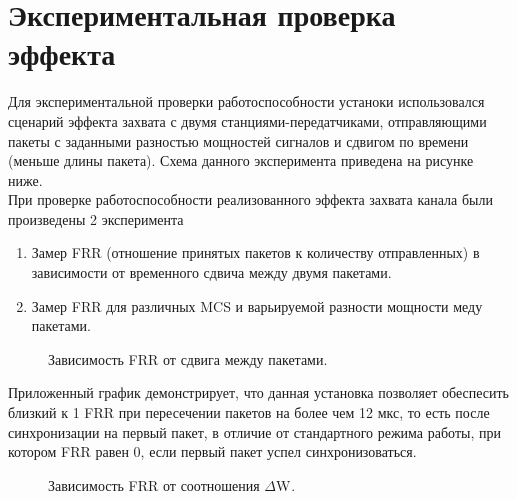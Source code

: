 \documentclass{llncs}
\begin{document}
\section{Экспериментальная проверка эффекта}
Для экспериментальной проверки работоспособности устаноки использовался сценарий эффекта захвата с двумя станциями-передатчиками, отправляющими пакеты с заданными разностью мощностей сигналов и сдвигом по времени (меньше длины пакета). Схема данного эксперимента приведена на рисунке ниже. 
\\
При проверке работоспособности реализованного эффекта захвата канала были произведены 2 эксперимента 
\begin{enumerate}
\item Замер FRR (отношение принятых пакетов к количеству отправленных) в зависимости от временного сдвича между двумя пакетами. 
\item Замер FRR для различных MCS и варьируемой разности мощности меду пакетами.
\end{enumerate}
\begin{figure}[ht!]
\caption{Зависимость FRR от сдвига между пакетами.}
\label{ris:image}
\end{figure}
Приложенный график демонстрирует, что данная установка позволяет обеспесить близкий к 1 FRR при пересечении пакетов на более чем 12 мкс, то есть после синхронизации на первый пакет, в отличие от стандартного режима работы, при котором FRR равен 0, если первый пакет успел синхронизоваться.
\\
\begin{figure}[htp!]
\caption{Зависимость FRR от соотношения $\Delta$W$_{}.$}
\label{ris:image}
\end{figure}
\end{document}

